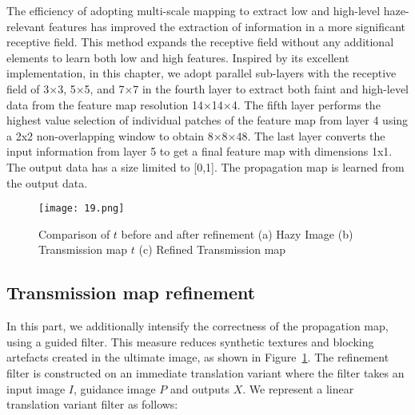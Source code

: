 \documentclass[doctor,english,listoffigures,listoftables]{thesis-uestc}
\begin{document}
The efficiency of adopting multi-scale mapping to extract low and high-level haze-relevant features has improved the extraction of information in a more significant receptive field. This method expands the receptive field without any additional elements to learn both low and high features. Inspired by its excellent implementation, in this chapter, we adopt parallel sub-layers with the receptive field of 3×3, 5×5, and 7×7 in the fourth layer to extract both faint and high-level data from the feature map resolution 14×14×4. The fifth layer performs the highest value selection of individual patches of the feature map from layer 4 using a 2x2 non-overlapping window to obtain 8×8×48. The last layer converts the input information from layer 5  to get a final feature map with dimensions 1x1. The output data has a size limited to [0,1]. The propagation map is learned from the output data. 
\begin{figure}[H]
\begin{center}
\texttt{[image: 19.png]}
\caption{Comparison of $t$ before and after refinement (a) Hazy Image  (b) Transmission map $t$ (c) Refined Transmission map}
\label{fig:5}
\end{center}
\end{figure} 
\subsection{Transmission map refinement} 
In this part, we additionally intensify the correctness of the propagation map, using a guided filter. This measure reduces synthetic textures and blocking artefacts created in the ultimate image, as shown in Figure~\ref{fig:5}. The refinement filter is constructed on an immediate translation variant where the filter takes an input image $I$, guidance image $P$ and outputs $X$. We represent a linear translation variant filter as follows:
\end{document}

